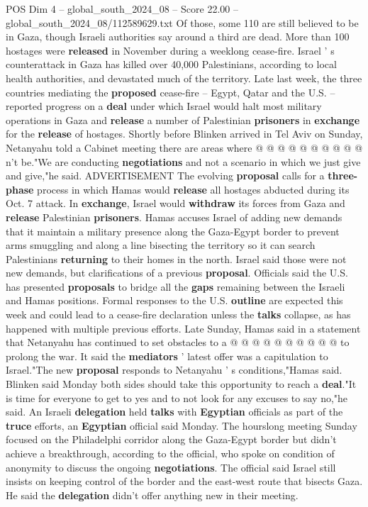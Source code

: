\begin{textsample}{POS Dim 4 – global\_south\_2024\_08 – Score 22.00 – global\_south\_2024\_08/112589629.txt}
Of those, some 110 are still believed to be in Gaza, though Israeli authorities say around a third are dead.
More than 100 hostages were \textbf{released} in November during a weeklong cease-fire.
Israel ' s counterattack in Gaza has killed over 40,000 Palestinians, according to local health authorities, and devastated much of the territory.
Late last week, the three countries mediating the \textbf{proposed} cease-fire -- Egypt, Qatar and the U.S. -- reported progress on a \textbf{deal} under which Israel would halt most military operations in Gaza and \textbf{release} a number of Palestinian \textbf{prisoners} in \textbf{exchange} for the \textbf{release} of hostages.
Shortly before Blinken arrived in Tel Aviv on Sunday, Netanyahu told a Cabinet meeting there are areas where @ @ @ @ @ @ @ @ @ @ n't be."We are conducting \textbf{negotiations} and not a scenario in which we just give and give,"he said.
ADVERTISEMENT The evolving \textbf{proposal} calls for a \textbf{three-phase} process in which Hamas would \textbf{release} all hostages abducted during its Oct. 7 attack.
In \textbf{exchange}, Israel would \textbf{withdraw} its forces from Gaza and \textbf{release} Palestinian \textbf{prisoners}.
Hamas accuses Israel of adding new demands that it maintain a military presence along the Gaza-Egypt border to prevent arms smuggling and along a line bisecting the territory so it can search Palestinians \textbf{returning} to their homes in the north.
Israel said those were not new demands, but clarifications of a previous \textbf{proposal}.
Officials said the U.S. has presented \textbf{proposals} to bridge all the \textbf{gaps} remaining between the Israeli and Hamas positions.
Formal responses to the U.S. \textbf{outline} are expected this week and could lead to a cease-fire declaration unless the \textbf{talks} collapse, as has happened with multiple previous efforts.
Late Sunday, Hamas said in a statement that Netanyahu has continued to set obstacles to a @ @ @ @ @ @ @ @ @ @ to prolong the war.
It said the \textbf{mediators} ' latest offer was a capitulation to Israel."The new \textbf{proposal} responds to Netanyahu ' s conditions,"Hamas said.
Blinken said Monday both sides should take this opportunity to reach a \textbf{deal}."It is time for everyone to get to yes and to not look for any excuses to say no,"he said.
An Israeli \textbf{delegation} held \textbf{talks} with \textbf{Egyptian} officials as part of the \textbf{truce} efforts, an \textbf{Egyptian} official said Monday.
The hourslong meeting Sunday focused on the Philadelphi corridor along the Gaza-Egypt border but didn't achieve a breakthrough, according to the official, who spoke on condition of anonymity to discuss the ongoing \textbf{negotiations}.
The official said Israel still insists on keeping control of the border and the east-west route that bisects Gaza.
He said the \textbf{delegation} didn't offer anything new in their meeting.

\end{textsample}
